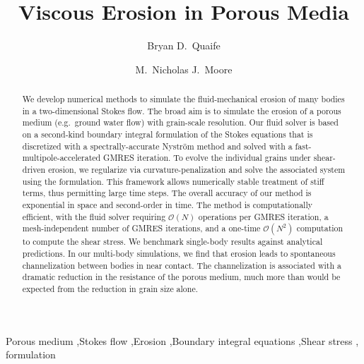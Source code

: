 \documentclass[preprint, 10pt]{elsarticle}
\begin{document}
\title{Viscous Erosion in Porous Media}


\author[Bryan]{Bryan D.~Quaife}
\author[Nick]{M.~Nicholas J.~Moore}
\address[Nick]{Department of Mathematics and Geophysical Fluid Dynamics Institute, Florida State University, Tallahassee, FL, 32306.}
\address[Bryan]{Department of Scientific Computing and Geophysical Fluid Dynamics Institute, Florida State University, Tallahassee, FL, 32306.}

\begin{abstract} 
We develop numerical methods to simulate the fluid-mechanical erosion of
many bodies in a two-dimensional Stokes flow. The broad aim
is to simulate the erosion of a porous medium (e.g.~ground water flow)
with grain-scale resolution. Our fluid solver is based on a
second-kind boundary integral formulation of the Stokes equations that is
discretized with a spectrally-accurate Nystr\"om method and solved
with a fast-multipole-accelerated GMRES iteration. To evolve the individual grains under shear-driven
erosion, we regularize via curvature-penalization and solve the
associated system using the {\thL} formulation. This framework allows
numerically stable treatment of stiff terms, thus permitting large time
steps. The overall accuracy of our method is exponential in space and
second-order in time. The method is computationally efficient, with the
fluid solver requiring $\mathcal{O}(N)$ operations per GMRES iteration,
a mesh-independent number of GMRES iterations, and a one-time
$\mathcal{O}(N^2)$ computation to compute the shear stress. We benchmark single-body results against analytical predictions. In our multi-body simulations, we find that erosion leads to spontaneous channelization between bodies in near contact. The channelization is associated with a dramatic reduction in the resistance of the porous medium, much more than would be expected from the reduction in grain size alone.
\end{abstract}

\begin{keyword}
  Porous medium \sep Stokes flow \sep Erosion \sep Boundary integral
  equations \sep Shear stress \sep {\thL} formulation
\end{keyword}

\maketitle
\end{document}
